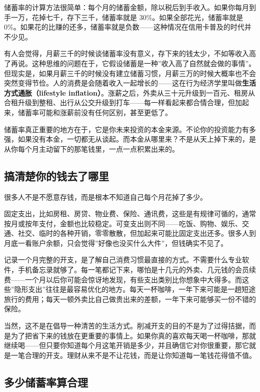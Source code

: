 \documentclass[a4paper,11pt,oneside,fontset=none,UTF8,zihao=-4]{ctexbook}
\begin{document}
储蓄率的计算方法很简单：每个月的储蓄金额，除以税后到手收入。如果你每月到手一万，花掉七千，存下三千，储蓄率就是
30\%。如果全部花光，储蓄率就是
0\%。如果花的比赚的还多，储蓄率就是负数------这种情况在信用卡普及的时代并不少见。

有人会觉得，月薪三千的时候谈储蓄率没有意义，存下来的钱太少，不如等收入高了再说。这种思维的问题在于，它假设储蓄是一种''收入高了自然就会做的事情''。但现实是，如果月薪三千的时候没有建立储蓄习惯，月薪三万的时候大概率也不会突然变得节俭。人的消费是会随着收入一起增长的------这在行为经济学里叫做\textbf{生活方式通胀（lifestyle
inflation）}。涨薪之后，外卖从三十元升级到一百元、租房从合租升级到整租、出行从公交升级到打车------每一样看起来都合情合理，但加起来，储蓄率可能和涨薪前没有任何区别，甚至更低了。

储蓄率真正重要的地方在于，它是你未来投资的本金来源。不论你的投资能力有多强，如果没有本金，一切都无从谈起。而本金从哪里来？不是从天上掉下来的，是从你每个月主动留下的那笔钱里，一点一点积累出来的。

\subsection{搞清楚你的钱去了哪里}\label{ux641eux6e05ux695aux4f60ux7684ux94b1ux53bbux4e86ux54eaux91cc}

很多人不是不愿意存钱，而是根本不知道自己每个月花掉了多少。

固定支出，比如房租、房贷、物业费、保险、通讯费，这些是有规律可循的，通常按月或按年支付，金额也比较稳定。可变支出则不同------吃饭、购物、娱乐、交通、社交、临时的各种开销，零零散散，但加起来可能比固定支出还多。很多人到月底一看账户余额，只会觉得''好像也没买什么大件''，但钱确实不见了。

记录一个月完整的开支，是了解自己消费习惯最直接的方式。不需要什么专业软件，手机备忘录就够了。每一笔都记下来，哪怕是十几元的外卖、几元钱的会员续费------一个月以后你可能会惊讶地发现，有些支出类别比你想象中大得多。而这些''隐形支出''往往是最容易优化的地方。每天一杯咖啡，一年下来可能是一趟短途旅行的费用；每天一顿外卖比自己做贵出来的差额，一年下来可能够买一份不错的保险。

当然，这不是在倡导一种清苦的生活方式。削减开支的目的不是为了过得拮据，而是为了把省下来的钱放在更重要的事情上。如果你真的喜欢每天喝一杯咖啡，那就继续喝------但只要你知道每个月这笔开销是多少，并且确信它对你很重要，那它就是一笔合理的开支。理财从来不是不让花钱，而是让你知道每一笔钱花得值不值。

\subsection{多少储蓄率算合理}\label{ux591aux5c11ux50a8ux84c4ux7387ux7b97ux5408ux7406}
\end{document}
